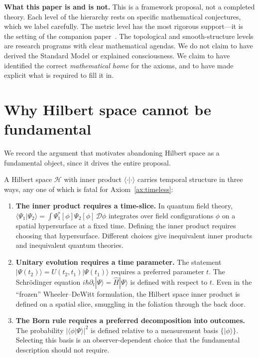 \documentclass[12pt,a4paper]{article}
\theoremstyle{definition}
\theoremstyle{remark}
\begin{document}
\noindent\textbf{What this paper is and is not.} This is a framework proposal,
not a completed theory. Each level of the hierarchy rests on specific
mathematical conjectures, which we label carefully. The metric level has the
most rigorous support---it is the setting of the companion
paper~\cite{fixed_point}. The topological and smooth-structure levels are
research programs with clear mathematical agendas. We do not claim to have
derived the Standard Model or explained consciousness. We claim to have
identified the correct \emph{mathematical home} for the axioms, and to have
made explicit what is required to fill it in.

\section{Why Hilbert space cannot be fundamental}
\label{sec:nohilbert}

We record the argument that motivates abandoning Hilbert space as a
fundamental object, since it drives the entire proposal.

A Hilbert space $\mathcal{H}$ with inner product $\langle\cdot|\cdot\rangle$
carries temporal structure in three ways, any one of which is fatal for
Axiom~\ref{ax:timeless}:

\begin{enumerate}

\item \textbf{The inner product requires a time-slice.} In quantum field
theory, $\langle\Psi_1|\Psi_2\rangle = \int \Psi_1^*[\phi]\Psi_2[\phi]
\,\mathcal{D}\phi$ integrates over field configurations $\phi$ on a spatial
hypersurface at a fixed time. Defining the inner product requires choosing that
hypersurface. Different choices give inequivalent inner products and
inequivalent quantum theories.

\item \textbf{Unitary evolution requires a time parameter.} The statement
$|\Psi(t_2)\rangle = U(t_2, t_1)|\Psi(t_1)\rangle$ requires a preferred
parameter $t$. The Schr\"odinger equation $i\hbar\partial_t|\Psi\rangle =
\hat{H}|\Psi\rangle$ is defined with respect to $t$. Even in the
``frozen'' Wheeler--DeWitt formulation, the Hilbert space inner product
is defined on a spatial slice, smuggling in the foliation through the
back door.

\item \textbf{The Born rule requires a preferred decomposition into outcomes.}
The probability $|\langle\phi|\Psi\rangle|^2$ is defined relative to a
measurement basis $\{|\phi\rangle\}$. Selecting this basis is an
observer-dependent choice that the fundamental description should not require.

\end{enumerate}
\end{document}
